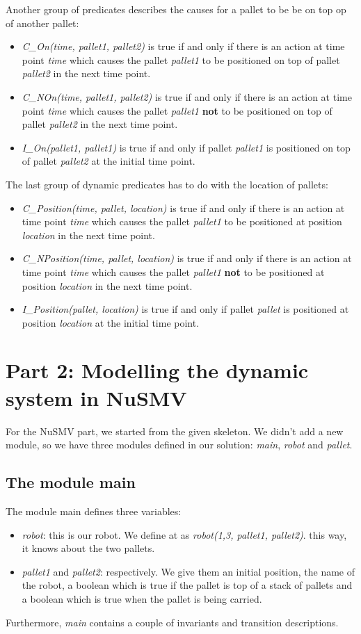 \documentclass[10pt,a4paper]{article}
\begin{document}
 
Another group of predicates describes the causes for a pallet to be be on top op of another pallet:
\begin{itemize}
  \item \emph{C\_On(time, pallet1, pallet2)} is true if and only if there is an action at time point \emph{time} which causes the pallet \emph{pallet1} to be positioned on top of pallet \emph{pallet2} in the next time point.
  \item \emph{C\_NOn(time, pallet1, pallet2)} is true if and only if there is an action at time point \emph{time} which causes the pallet \emph{pallet1} \textbf{not} to be positioned on top of pallet \emph{pallet2} in the next time point.
   \item \emph{I\_On(pallet1, pallet1)} is true if and only if  pallet \emph{pallet1} is positioned on top of pallet \emph{pallet2} at the initial time point.
   \end{itemize}
   The last group of dynamic predicates has to do with the location of pallets:
   \begin{itemize} 
   \item \emph{C\_Position(time, pallet, location)} is true if and only if there is an action at time point \emph{time} which causes the pallet \emph{pallet1} to be positioned at position \emph{location} in the next time point.
   \item \emph{C\_NPosition(time, pallet, location)} is true if and only if there is an action at time point \emph{time} which causes the pallet \emph{pallet1} \textbf{not} to be positioned at position \emph{location} in the next time point.
   \item \emph{I\_Position(pallet, location)} is true if and only if pallet \emph{pallet} is positioned at position \emph{location} at the initial time point.
\end{itemize}

\section*{Part 2: Modelling the dynamic system in NuSMV}
For the NuSMV part, we started from the given skeleton. We didn't add a new module, so we have three modules defined in our solution: \emph{main}, \emph{robot} and \emph{pallet}.
\subsection*{The module main}
The module main defines three variables:
\begin{itemize}
\item \emph{robot}: this is our robot. We define at as \emph{robot(1,3, pallet1, pallet2)}. this way, it knows about the two pallets.
\item \emph{pallet1} and \emph{pallet2}: respectively. We give them an initial position, the name of the robot, a boolean which is true if the pallet is top of a stack of pallets and a boolean which is true when the pallet is being carried.
\end{itemize}
Furthermore, \emph{main} contains a couple of invariants and transition descriptions.
\end{document}
